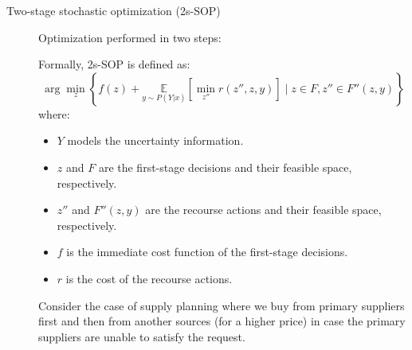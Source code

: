 \begin{description}
    \item[Two-stage stochastic optimization (2s-SOP)] 
        Optimization performed in two steps:

        Formally, 2s-SOP is defined as:
        \[ \arg\min_z \left\{ f(z) + \underset{y \sim P(Y|x)}{\mathbb{E}}\left[ \min_{z''} r(z'', z, y) \right] \mid z \in F, z'' \in F''(z, y) \right\} \]
        where:
        \begin{itemize}
            \item $Y$ models the uncertainty information.
            \item $z$ and $F$ are the first-stage decisions and their feasible space, respectively.
            \item $z''$ and $F''(z, y)$ are the recourse actions and their feasible space, respectively.
            \item $f$ is the immediate cost function of the first-stage decisions.
            \item $r$ is the cost of the recourse actions.
        \end{itemize}

        \begin{example}
            Consider the case of supply planning where we buy from primary suppliers first and then from another sources (for a higher price) in case the primary suppliers are unable to satisfy the request.


\end{example}
\end{description}
